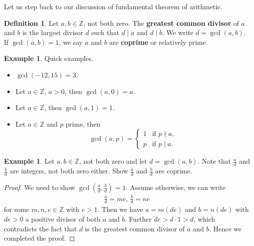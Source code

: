 \documentclass{amsbook}
\theoremstyle{plain}
\theoremstyle{definition}
\newtheorem{definition}[theorem]{Definition}
\newtheorem{example}[theorem]{Example}
\theoremstyle{remark}
\numberwithin{equation}{chapter}
\numberwithin{figure}{chapter}
\begin{document}
Let us step back to our discussion of fundamental theorem of arithmetic. 
\begin{definition}
Let $a, b \in \mathbb{Z}$, not both zero. The \textbf{greatest common divisor} of $a$ and $b$ is the largest divisor $d$ such that $d \mid a$ and $d \mid b$. We write $d = \gcd(a,b)$. If $\gcd(a,b) = 1$, we say $a$ and $b$ are \textbf{coprime} or relatively prime.
\end{definition}

\begin{example}\label{ex:ex2_day4}
Quick examples.
\begin{itemize}
\item $\gcd(-12, 15) = 3$.
\item Let $a \in \mathbb{Z}$, $a > 0$, then $\gcd(a, 0) = a$.
\item Let $a \in \mathbb{Z}$, then $\gcd(a, 1) = 1$.
\item Let $a \in \mathbb{Z}$ and $p$ prime, then 
\[
\gcd(a, p) = \left\{ \begin{array}{rl}
               1 & \text{if $p \nmid a$,} \\[1mm]
               p & \text{if $p \mid a$.} 
\end{array} \right.
\]
\end{itemize}
\end{example}

\begin{example}\label{ex:takeout_gcd_coprime}
Let $a, b \in \mathbb{Z}$, not both zero and let $d = \gcd(a, b)$. Note that $\frac{a}d$ and $\frac{b}d$ are integers, not both zero either. Show $\frac{a}d$ and $\frac{b}d$ are coprime.
\end{example}
\begin{proof}
We need to show $\gcd (\frac{a}d, \frac{b}d) = 1$. Assume otherwise, we can write 
\begin{align}
\frac{a}d = me, \,
\frac{b}d = ne 
\end{align}
for some $m, n, e \in \mathbb{Z}$ with $e > 1$. Then we have $a = m(de)$ and $b = n(de)$ with $de>0$ a positive divisor of both $a$ and $b$. Further $de > d \cdot 1 > d$, which contradicts the fact that $d$ is the greatest common divisor of $a$ and $b$. Hence we completed the proof. 
\end{proof}
\end{document}

